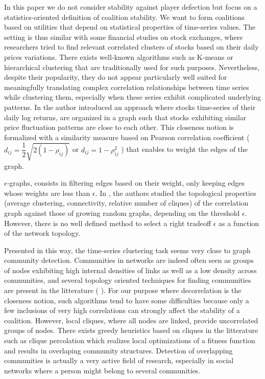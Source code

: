 \documentclass[conference]{IEEEtran}
\begin{document}
In this paper we do not consider stability against player defection but focus on a statistics-oriented definition of coalition stability. We want to form coalitions based on utilities that depend on statistical properties of time-series values. The setting is thus similar with some financial studies on stock exchanges, where researchers tried to find relevant correlated clusters of stocks based on their daily prices variations. There exists well-known algorithms such as K-means or hierarchical clustering that are traditionally used for such purposes. Nevertheless, despite their popularity, they do not appear particularly well suited for meaningfully translating complex correlation relationships between time series while clustering them, especially when these series exhibit complicated underlying patterns. In \cite{Mantegna1999} the author introduced an approach where stocks time-series of their daily log returns, are organized in a graph such that stocks exhibiting similar price fluctuation patterns are close to each other. This closeness notion is formalized with a similarity measure based on Pearson correlation coefficient ($ d_{ij} = \dfrac{1}{2}\sqrt{2(1-\rho_{ij})} $ or $ d_{ij} = 1 - \rho_{ij}^{2} $ ) that enables to weight the edges of the graph. 

$\epsilon$-graphs, consists in filtering edges based on their weight, only keeping edges whose weights are less than $ \epsilon $. In \cite{Garas2008, Onnela2004}, the authors studied the topological properties (average clustering, connectivity, relative number of cliques) of the correlation graph against those of growing random graphs, depending on the threshold $ \epsilon $. However, there is no well defined method to select a right tradeoff $ \epsilon $ as a function of the network topology.

Presented in this way, the time-series clustering task seems very close to graph community detection. Communities in networks are indeed often seen as groups of nodes exhibiting high internal densities of links as well as a low density across communities, and several topology oriented techniques for finding communities are present in the litterature (\cite{Newman2013} \cite{Girvan2002} \cite{Newman2013_2}). For our purpose where decorrelation is the closeness notion, such algorithms tend to have some difficulties because only a few inclusions of very high correlations can strongly affect the stability of a coalition. However, local cliques, where all nodes are linked, provide uncorrelated groups of nodes. There exists greedy heuristics based on cliques in the litterature such as clique percolation \cite{Lancichinetti} which realizes local optimizations of a fitness function and results in overlaping community structures. Detection of overlapping communities is actually a very active field of research, especially in social networks where a person might belong to several communities.  
\end{document}
